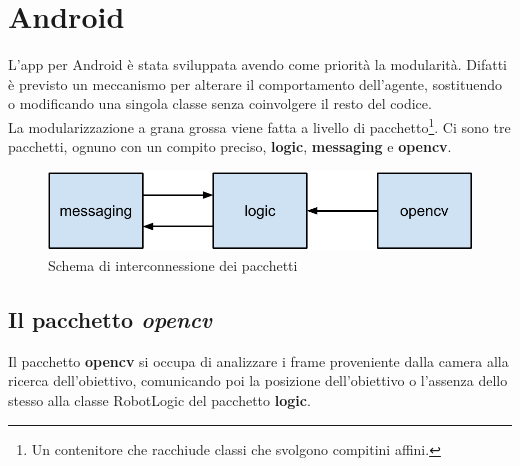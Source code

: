 \section {Android}
L'app per Android è stata sviluppata avendo come priorità la modularità. 
Difatti è previsto un meccanismo per alterare il comportamento dell'agente, 
sostituendo o modificando una singola classe senza coinvolgere il resto del codice.\\
La modularizzazione a grana grossa viene fatta a livello di pacchetto\footnote{Un contenitore 
che racchiude classi che svolgono compitini affini.}. Ci sono tre pacchetti,
ognuno con un compito preciso, \textbf{logic}, \textbf{messaging} e \textbf{opencv}.
\begin{figure}[H] \center
\includegraphics[width=\textwidth]{immagini/interconnessione_pacchetti.pdf}
\caption{Schema di interconnessione dei pacchetti} 
\end{figure}

\subsection {Il pacchetto \textit{opencv}}
Il pacchetto \textbf{opencv} si occupa di analizzare 
i frame proveniente dalla camera alla ricerca dell'obiettivo, comunicando poi la posizione 
dell'obiettivo o l'assenza dello stesso alla classe RobotLogic del pacchetto 
\textbf{logic}.

